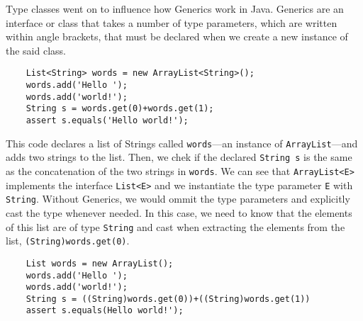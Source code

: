 
Type classes went on to influence how Generics work in Java. Generics are an interface or class that takes a number of type parameters, which are written within angle brackets, that must be declared when we create a new instance of the said class.

\begin{lstlisting}
    List<String> words = new ArrayList<String>();
    words.add('Hello ');
    words.add('world!');
    String s = words.get(0)+words.get(1);
    assert s.equals('Hello world!');
\end{lstlisting}

This code declares a list of Strings called \lstinline|words|---an instance of \lstinline|ArrayList|---and adds two strings to the list. Then, we chek if the declared \lstinline|String s| is the same as the concatenation of the two strings in \lstinline|words|.
We can see that \lstinline|ArrayList<E>| implements the interface \lstinline|List<E>| and we instantiate the type parameter \lstinline|E| with \lstinline|String|. Without Generics, we would ommit the type parameters and explicitly cast the type whenever needed. In this case, we need to know that the elements of this list are of type \lstinline|String| and cast when extracting the elements from the list, \lstinline|(String)words.get(0)|.
\begin{lstlisting}
    List words = new ArrayList();
    words.add('Hello ');
    words.add('world!');
    String s = ((String)words.get(0))+((String)words.get(1)) 
    assert s.equals(Hello world!');
\end{lstlisting}



\LIMPA